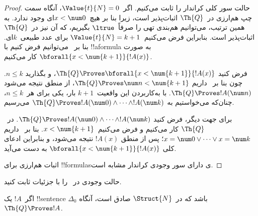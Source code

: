\documentclass[../../../include/open-logic-section]{subfiles}
\begin{document}
\begin{proof}
    حالت سور کلی کراندار را ثابت می‌کنیم.
    اگر~$\Value{t}{N} = 0$، آنگاه سمت چپ هم‌ارزی در~$\Th{Q}$
    اثبات‌پذیر است، زیرا بنا بر
     هیچ~$x<\num 0$ای وجود ندارد.
    به همین ترتیب، می‌توانیم هم‌بندی تهی را صرفاً~$\ltrue$ بگیریم،
    که آن نیز در~$\Th{Q}$ اثبات‌پذیر است.
    بنابراین فرض می‌کنیم~$\Value{t}{N} = k+1$ برای عدد طبیعی~$k$ای.
    بنا بر~
    می‌توانیم فرض کنیم با !!a{formula} به صورت
    $\bforall{x<\num{k+1}}{!A(x)}$ کار می‌کنیم.

    فرض کنید
    $\Th{Q} \Proves \bforall{x<\num{k+1}}{!A(x)}$، و بگذارید
    $n \leq k$. چون بنا بر~ داریم
    $\Th{Q} \Proves \num n < \num{k+1}$، از منطق نتیجه می‌شود
    $\Th{Q} \Proves !A(\num n)$. با به‌کاربردن این واقعیت~$k+1$
    بار، یکی برای هر~$n \leq k$، چنان‌که می‌خواستیم به
    $\Th{Q} \Proves !A(\num 0) \land \dots \land !A(\num k)$
    می‌رسیم.

    برای جهت دیگر، فرض کنید
    $\Th{Q} \Proves !A(\num 0) \land \dots \land !A(\num k)$.
    در~$\Th{Q}$ کار می‌کنیم و فرض می‌کنیم~$x < \num{k+1}$.
    بنا بر~ داریم
    $x = \num 0 \lor \dots \lor x = \num k$؛ پس از منطق
    $!A(x)$ نتیجه می‌شود، و بنابراین ادعای کلی
    $\bforall{x<\num{k+1}}{!A(x)}$ به دست می‌آید.

    اثبات هم‌ارزی برای !!{formula}sی دارای سور وجودی کراندار مشابه است.
\end{proof}

\begin{prob}
حالت وجودی در~ را با جزئیات ثابت کنید.
\end{prob}

\begin{lem}
اگر~$!A$ یک !!{sentence} $\Delta_0$ باشد که در~$\Struct{N}$ صادق است،
آنگاه~$\Th{Q} \Proves !A$.
\end{lem}
\end{document}
